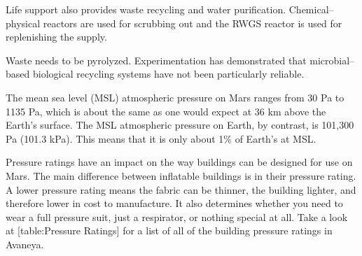 Life support also provides waste recycling and water purification. Chemical--physical reactors are used for scrubbing  out and the RWGS reactor is used for replenishing the  supply. 

Waste needs to be pyrolyzed. Experimentation has demonstrated that microbial--based biological recycling systems have not been particularly reliable.

The mean sea level (MSL) atmospheric pressure on Mars ranges from 30 Pa to 1135 Pa, which is about the same as one would expect at 36 km above the Earth's surface. The MSL atmospheric pressure on Earth, by contrast, is 101,300 Pa (101.3 kPa). This means that it is only about 1\% of Earth's at MSL.

Pressure ratings have an impact on the way buildings can be designed for use on Mars. The main difference between inflatable buildings is in their pressure rating. A lower pressure rating means the fabric can be thinner, the building lighter, and therefore lower in cost to manufacture. It also determines whether you need to wear a full pressure suit, just a respirator, or nothing special at all. Take a look at [table:Pressure Ratings] for a list of all of the building pressure ratings in Avaneya.

